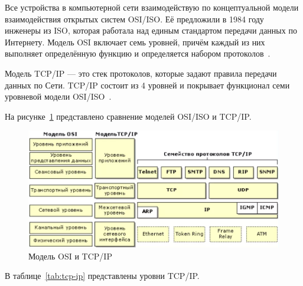 Все устройства в компьютерной сети взаимодействую по концептуальной модели взаимодействия открытых систем OSI/ISO. 
Её предложили в 1984 году инженеры из ISO, которая работала над единым стандартом передачи данных по Интернету. 
Модель OSI включает семь уровней, причём каждый из них выполняет определённую функцию и определяется набором протоколов~\cite{tcp_ip_reilly, tcp_ip_lora}.

Модель TCP/IP --- это стек протоколов, которые задают правила передачи данных по Сети. TCP/IP состоит из 4 уровней и покрывает функционал семи уровневой модели OSI/ISO~\cite{tcp_ip_reilly, tcp_ip_lora}.

На рисунке~\ref{pr:protocol} представлено сравнение моделей  OSI/ISO и TCP/IP.

\begin{figure}[h]
	\centering
	\includegraphics[width=1\textwidth]{img/protocol.png}
	\caption{Модель OSI и TCP/IP~\cite{tcp_ip_reilly, tcp_ip_lora}}
	\label{pr:protocol}
\end{figure}

\clearpage

В таблице~\ref{tab:tcp-ip} представлены уровни TCP/IP.

